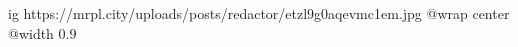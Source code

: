  
 
 
 
 

\ifcmt
  ig https://mrpl.city/uploads/posts/redactor/etzl9g0aqevmc1em.jpg
  @wrap center
  @width 0.9
\fi
